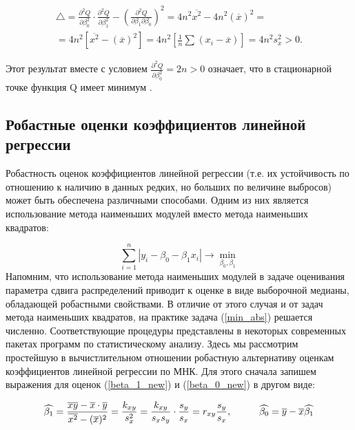\documentclass[../body.tex]{subfiles}
\begin{document}
	\begin{multline}
		\bigtriangleup = \frac{\partial^{2}Q}{\partial \beta_{0}^{2}} \cdot \frac{\partial^{2}Q}{\partial \beta_{1}^{2}} - (\frac{\partial^{2}Q}{\partial \beta_{1} \partial \beta_{0}})^{2} = 
		4n^{2}\overline{x^{2}} - 4n^2(\overline{x})^{2} = \\
		= 4n^{2}\left[\overline{x^{2}} - (\overline{x})^{2}\right] = 4n^{2}\left[ \frac{1}{n}\sum{}_{}{(x_{i} - \overline{x})}\right] = 4n^{2}s_{x}^{2} > 0.
		\label{det_sys}
	\end{multline}
	
	Этот результат вместе с условием $\frac{\partial^{2}Q}{\partial \beta_{0}^{2}} = 2n > 0$ означает, что в стационарной точке функция Q имеет минимум \cite[c.~508-511]{max}.
	
	
	
	
	
	
	
	
	\subsection{Робастные оценки коэффициентов линейной регрессии}
	Робастность оценок коэффициентов линейной регрессии (т.е. их устойчивость по отношению к наличию в данных редких, но больших по величине выбросов) может быть обеспечена различными способами. Одним из них является использование метода наименьших модулей вместо метода наименьших квадратов:
	
	\begin{equation}
		\sum_{i=1}^{n}{|y_{i} - \beta_{0} - \beta_{1}x_{i}|}\rightarrow \min_{\beta_{0}, \beta_{1}}
		\label{min_abs}
	\end{equation}
	Напомним, что использование метода наименьших модулей в задаче оценивания параметра сдвига распределений приводит к оценке в виде выборочной медианы, обладающей робастными свойствами. В отличие от этого случая и от задач метода наименьших квадратов, на практике задача (\ref{min_abs}) решается численно. Соответствующие процедуры представлены в некоторых современных пакетах программ по статистическому анализу.
	\newline \newline
	Здесь мы рассмотрим простейшую в вычистлительном отношении робастную альтернативу оценкам коэффициентов линейной регрессии по МНК. Для этого сначала запишем выражения для оценок (\ref{beta_1_new}) и (\ref{beta_0_new}) в другом виде:
	 
	\begin{equation}
		\widehat{\beta_1} = \frac{\overline{xy} - \overline{x} \cdot \overline{y}}{\overline{x^2} - (\overline{x})^{2}} = \frac{k_{xy}}{s_x^2} = \frac{k_{xy}}{s_x s_y} \cdot \frac{s_{y}}{s_x} = r_{xy}\frac{s_y}{s_x},\hspace{10mm}
		\widehat{\beta_{0}} = \overline{y} - \overline{x}\widehat{\beta_1}
		\label{new_coef_abs}
	\end{equation}
	
\end{document}
